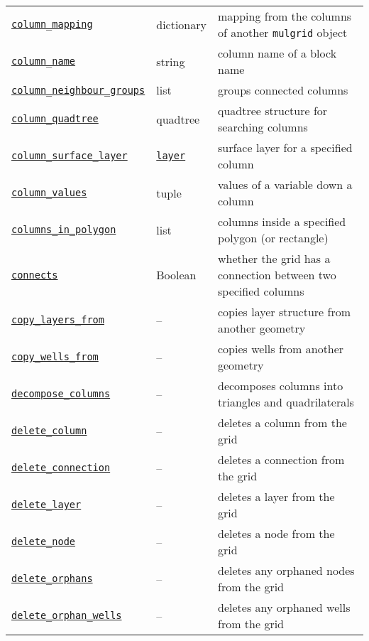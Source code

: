 \begin{center}
\begin{longtable}{|l|l|p{70mm}|}
  \hyperref[sec:mulgrid:column_mapping]{\texttt{column\_mapping}} & dictionary & mapping from the columns of another \texttt{mulgrid} object\\
  \hyperref[sec:mulgrid:column_name]{\texttt{column\_name}} & string & column name of a block name\\ 
  \hyperref[sec:mulgrid:column_neighbour_groups]{\texttt{column\_neighbour\_groups}} & list & groups connected columns\\ 
  \hyperref[sec:mulgrid:column_quadtree]{\texttt{column\_quadtree}} & quadtree & quadtree structure for searching columns\\ 
  \hyperref[sec:mulgrid:column_surface_layer]{\texttt{column\_surface\_layer}} & \hyperref[layerobjects]{\texttt{layer}} & surface layer for a specified column\\
  \hyperref[sec:mulgrid:column_values]{\texttt{column\_values}} & tuple & values of a variable down a column\\
  \hyperref[sec:mulgrid:columns_in_polygon]{\texttt{columns\_in\_polygon}} & list & columns inside a specified polygon (or rectangle)\\ 
  \hyperref[sec:mulgrid:connects]{\texttt{connects}} & Boolean & whether the grid has a connection between two specified columns\\ 
  \hyperref[sec:mulgrid:copy_layers_from]{\texttt{copy\_layers\_from}} & -- & copies layer structure from another geometry\\ 
  \hyperref[sec:mulgrid:copy_wells_from]{\texttt{copy\_wells\_from}} & -- & copies wells from another geometry\\ 
  \hyperref[sec:mulgrid:decompose_columns]{\texttt{decompose\_columns}} & -- & decomposes columns into triangles and quadrilaterals\\ 
  \hyperref[sec:mulgrid:delete_column]{\texttt{delete\_column}} & -- & deletes a column from the grid\\ 
  \hyperref[sec:mulgrid:delete_connection]{\texttt{delete\_connection}} & -- & deletes a connection from the grid\\ 
  \hyperref[sec:mulgrid:delete_layer]{\texttt{delete\_layer}} & -- & deletes a layer from the grid\\ 
  \hyperref[sec:mulgrid:delete_node]{\texttt{delete\_node}} & -- & deletes a node from the grid\\ 
  \hyperref[sec:mulgrid:delete_orphans]{\texttt{delete\_orphans}} & -- & deletes any orphaned nodes from the grid\\ 
  \hyperref[sec:mulgrid:delete_orphan_wells]{\texttt{delete\_orphan\_wells}} & -- & deletes any orphaned wells from the grid\\ 

\end{longtable}
\end{center}
